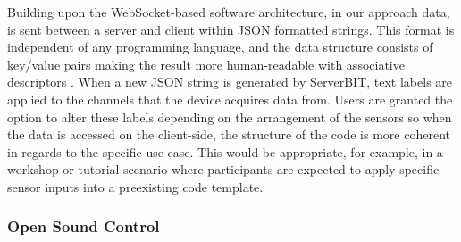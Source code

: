 Building upon the WebSocket-based software architecture, in our approach data, is sent between a server and client within JSON formatted strings. This format is independent of any programming language, and the data structure consists of key/value pairs making the result more human-readable with associative descriptors \cite{marrs_json_2017}. When a new JSON string is generated by ServerBIT, text labels are applied to the channels that the device acquires data from. Users are granted the option to alter these labels depending on the arrangement of the sensors so when the data is accessed on the client-side, the structure of the code is more coherent in regards to the specific use case. This would be appropriate, for example, in a workshop or tutorial scenario where participants are expected to apply specific sensor inputs into a preexisting code template.

\subsubsection*{Open Sound Control}

